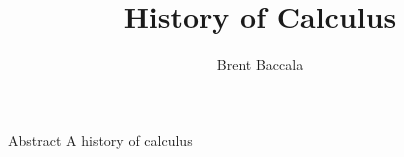 \documentclass{beamer}
\title{History of Calculus}
\author{Brent Baccala}
\institute{\tt cosine@freesoft.org}
\begin{document}
\begin{frame}
\titlepage
\begin{block}{Abstract}
A history of calculus
\end{block}
\end{frame}
\end{document}

